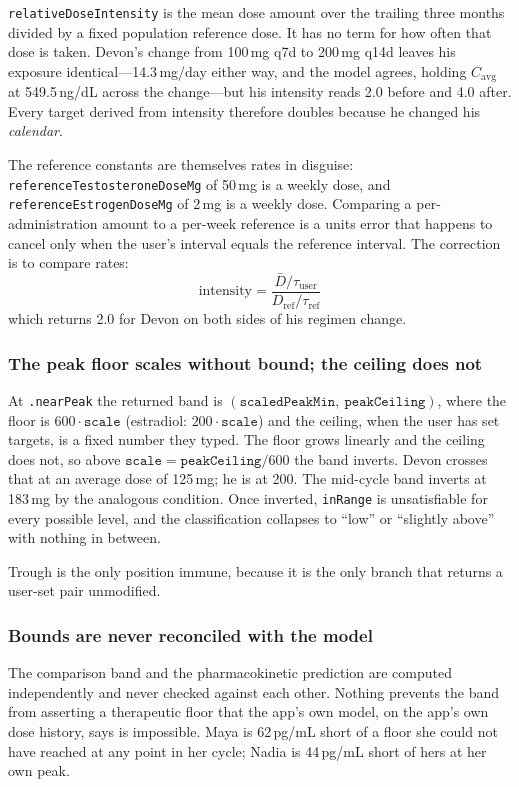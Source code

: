 \documentclass[11pt,a4paper]{article}
\newcommand{\code}[1]{\texttt{\small #1}}
\begin{document}
\code{relativeDoseIntensity} is the mean dose amount over the trailing three
months divided by a fixed population reference dose. It has no term for how
often that dose is taken. Devon's change from 100\,mg q7d to 200\,mg q14d
leaves his exposure identical---14.3\,mg/day either way, and the model
agrees, holding $C_{\mathrm{avg}}$ at 549.5\,ng/dL across the change---but
his intensity reads 2.0 before and 4.0 after. Every target derived from
intensity therefore doubles because he changed his \emph{calendar}.

The reference constants are themselves rates in disguise:
\code{referenceTestosteroneDoseMg} of 50\,mg is a weekly dose, and
\code{referenceEstrogenDoseMg} of 2\,mg is a weekly dose. Comparing a
per-administration amount to a per-week reference is a units error that
happens to cancel only when the user's interval equals the reference
interval. The correction is to compare rates:
\[
\text{intensity} = \frac{\bar{D} / \tau_{\text{user}}}
                        {D_{\text{ref}} / \tau_{\text{ref}}}
\]
which returns 2.0 for Devon on both sides of his regimen change.

\subsubsection{The peak floor scales without bound; the ceiling does not}

At \code{.nearPeak} the returned band is
$(\texttt{scaledPeakMin},\ \texttt{peakCeiling})$, where the floor is
$600 \cdot \texttt{scale}$ (estradiol: $200 \cdot \texttt{scale}$) and the
ceiling, when the user has set targets, is a fixed number they typed. The
floor grows linearly and the ceiling does not, so above
$\texttt{scale} = \texttt{peakCeiling}/600$ the band inverts. Devon crosses
that at an average dose of 125\,mg; he is at 200. The mid-cycle band
inverts at 183\,mg by the analogous condition. Once inverted,
\code{inRange} is unsatisfiable for every possible level, and the
classification collapses to ``low'' or ``slightly above'' with nothing in
between.

Trough is the only position immune, because it is the only branch that
returns a user-set pair unmodified.

\subsubsection{Bounds are never reconciled with the model}

The comparison band and the pharmacokinetic prediction are computed
independently and never checked against each other. Nothing prevents the
band from asserting a therapeutic floor that the app's own model, on the
app's own dose history, says is impossible. Maya is 62\,pg/mL short of a
floor she could not have reached at any point in her cycle; Nadia is
44\,pg/mL short of hers at her own peak.
\end{document}
